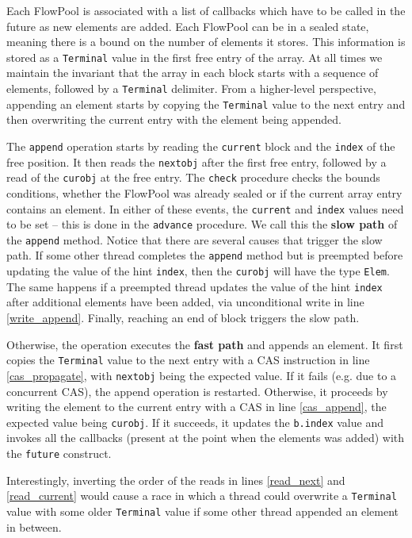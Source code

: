 \documentclass[runningheads,a4paper]{llncs}
\begin{document}
Each FlowPool is associated with a list of callbacks which have
to be called in the future as new elements are added.
Each FlowPool can be in a sealed state, meaning there is a bound on
the number of elements it stores.
This information is stored as a \verb=Terminal= value in the first
free entry of the array.
At all times we maintain the invariant that the array in each block
starts with a sequence of elements, followed by a \verb=Terminal=
delimiter. From a higher-level perspective, appending an element
starts by copying the \verb=Terminal= value to the next entry and then
overwriting the current entry with the element being appended.

The \verb=append= operation starts by reading the \verb=current= block
and the \verb=index= of the free position.
It then reads the
\verb=nextobj= after the first free entry, followed by a read of the
\verb=curobj= at the free entry.
The \verb=check= procedure checks the bounds conditions, whether the
FlowPool was already sealed or if the current array entry contains an
element.
In either of these events, the \verb=current= and \verb=index= values
need to be set -- this is done in the \verb=advance= procedure.
We call this the \textbf{slow path} of the \verb=append= method.
Notice that there are several causes that trigger the slow path.
If some other thread completes the \verb=append= method but is
preempted before updating the value of the hint \verb=index=, then the
\verb=curobj= will have the type \verb=Elem=.
The same happens if a preempted thread updates the value of the
hint \verb=index= after additional elements have been added,
via unconditional write in line \ref{write_append}.
Finally, reaching an end of block triggers the slow path.

Otherwise, the operation executes the \textbf{fast path} and appends
an element.
It first copies the \verb=Terminal= value to the next entry with a CAS
instruction in line \ref{cas_propagate}, with \verb=nextobj= being the
expected value. If it fails (e.g. due to a concurrent CAS), the append
operation is restarted.
Otherwise, it proceeds by writing the element to the current entry with
a CAS in line \ref{cas_append}, the expected value being
\verb=curobj=.
If it succeeds, it updates the \verb=b.index= value and invokes all
the callbacks (present at the point when the elements was added) with
the \verb=future= construct.

Interestingly, inverting the order of the reads in lines
\ref{read_next} and \ref{read_current} would cause a race in which a
thread could overwrite a \verb=Terminal= value with some older
\verb=Terminal= value if some other thread appended an element in between.
\end{document}
